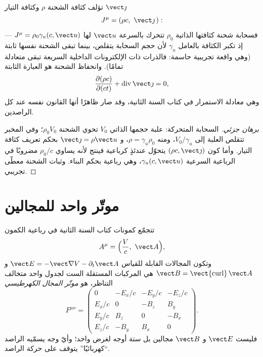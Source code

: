 \begin{proposition}\label{prop:b3:covariant-electromagnetism:fourcurrent}
تؤلف كثافة الشحنة $\rho$ وكثافة التيار $\vect\jmath$ 
\[
J^\mu = (\rho c,\ \vect\jmath\,) :
\]
فسحابة شحنة كثافتها الذاتية $\rho_0$ تتحرك بالسرعة $\vect u$ لها
$J^\mu = \rho_0\gamma_u(c, \vect u)$ --- إذ تكبر الكثافة بالعامل $\gamma_u$
لأن حجم السحابة يتقلص، بينما تبقى الشحنة نفسها
ثابتة (وهي واقعة تجريبية حاسمة: فالذرات ذات الإلكترونات
الداخلية السريعة تبقى متعادلة تمامًا). وانحفاظ الشحنة هو العبارة
الثابتة
\[
\frac{\partial(\rho c)}{\partial(ct)} +
\operatorname{div}\vect\jmath = 0 ,
\]
وهي معادلة الاستمرار في كتاب السنة الثانية، وقد صار ظاهرًا أنها
القانون نفسه عند كل الراصدين.
\end{proposition}

\begin{proof}[برهان جزئي]
السحابة المتحركة: علبة حجمها الذاتي $V_0$ تحوي الشحنة $\rho_0
V_0$؛ وفي المخبر تتقلص العلبة إلى $V_0/\gamma_u$، ومنه $\rho =
\gamma_u\rho_0$، و $\vect\jmath = \rho\vect u$ بحكم تعريف كثافة
التيار. وأما كون $(\rho c, \vect\jmath)$ يتحوّل عندئذٍ كرباعية
فينتج لأنه يساوي $\rho_0/c$ مضروبًا في
الرباعية السرعية $\gamma_u(c, \vect u)$، وهي رباعية بحكم
البناء. وثبات الشحنة معطًى تجريبي.
\end{proof}

\section{موتّر واحد للمجالين}

\begin{definition}\label{def:b3:covariant-electromagnetism:tensor}
تتجمّع كمونات كتاب السنة الثانية في رباعية الكمون
\[
A^\mu = \Big(\frac{V}{c},\ \vect A\Big) ,
\]
وتكون المجالات القابلة للقياس $\vect E = -\vect\nabla V -
\partial_t\vect A$ و $\vect B = \operatorname{\vect{curl}}\vect A$ هي
المركبات المستقلة الست لجدول واحد متخالف التناظر، هو
\emph{موتّر المجال الكهرطيسي}
\[
F^{\mu\nu} =
\begin{pmatrix}
0 & -E_x/c & -E_y/c & -E_z/c\\
E_x/c & 0 & -B_z & B_y\\
E_y/c & B_z & 0 & -B_x\\
E_z/c & -B_y & B_x & 0
\end{pmatrix} .
\]
فليست $\vect E$ و $\vect B$ مجالين بل ستة أوجه لغرض واحد؛
وأيّ وجه يسمّيه الراصد ``كهربائيًا'' يتوقف على حركة
الراصد.
\end{definition}


